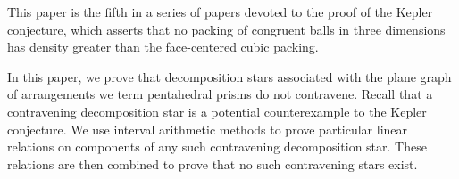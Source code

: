This paper is the fifth in a series of papers devoted to the proof
of the Kepler conjecture, which asserts that no packing of congruent
balls in three dimensions has density greater than the face-centered
cubic packing.

In this paper, we prove that decomposition stars associated with the
plane graph of arrangements we term pentahedral prisms do not
contravene.  Recall that a contravening decomposition star is a
potential counterexample to the Kepler conjecture. We use interval
arithmetic methods to prove particular linear relations on
components of any such contravening decomposition star.  These
relations are then combined to prove that no such contravening stars
exist.
